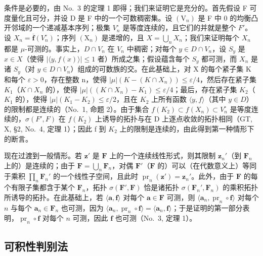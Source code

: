 条件是必要的，由 No.~3 的定理 1 即得；我们来证明它是充分的。首先假设 F 可度量化且可分，并设 D 是 F 中的一个可数稠密集。设 \((\mathrm{V}_{n})\) 是 F 中 0 的均衡凸开邻域的一个递减基本序列；极集 \(V_{n}^{\circ}\) 是等度连续的，且它们的并就是整个 \(F'\)。设 \(X_{n} = \overline{\mathbf{f}}(V_{n}^{\circ})\)；序列 \((\mathrm{X}_{n})\) 是递增的，且 \(X = \bigcup_{n} X_{n}\)；我们来证明每个 \(X_{n}\) 都是 \(\mu\)-可测的。事实上，\(D \cap V_{n}\) 在 \(V_{n}\) 中稠密；对每个 \(y \in D \cap V_{n}\)，设 \(S_{y}\) 是 \(x \in X\)（使得 \(|\langle y, f(x) \rangle| \leqslant 1\) 者）所成之集；假设蕴含每个 \(S_{y}\) 都可测，而 \(X_{n}\) 是诸 \(S_{y}\)（对 \(y \in D \cap V_{n}\)）组成的可数族的交。在此基础上，对 X 的每个紧子集 K 和每个 \(\varepsilon > 0\)，存在整数 n，使得 \(|\mu| (K - (K \cap X_{n})) \leqslant \varepsilon/4\)，然后存在紧子集 \(K_{1}\)（\(K \cap X_{n}\) 的），使得 \(|\mu| ((K \cap X_{n}) - K_{1}) \leqslant \varepsilon/4\)；最后，存在紧子集 \(K_{2}\)（\(K_{1}\) 的），使得 \(|\mu| (K_{1} - K_{2}) \leqslant \varepsilon/2\)，且在 \(K_{2}\) 上所有函数 \(\langle y, f \rangle\)（其中 \(y \in D\)）的限制都是连续的（No.~1, 命题 2）。由于集合 \(f(K_{2}) \subset f(X_{n}) \subset V_{n}^{\circ}\) 是等度连续的，\(\sigma(F', F)\) 在 \(f(K_{2})\) 上诱导的拓扑与在 D 上逐点收敛的拓扑相同（GT, X, §2, No.~4, 定理 1）；因此 f 到 \(K_{2}\) 上的限制是连续的，由此得到第一种情形下的断言。

现在过渡到一般情形。若 \(\mathbf{z}'\) 是 \(\mathbf{F}\) 上的一个连续线性形式，则其限制 \(\mathbf{z}_n'\)（到 \(\mathbf{F}_n\) 上的）是连续的；由于 \(\mathbf{F} = \bigcup_{n} \mathbf{F}_n\)，对偶 \(\mathbf{F}'\)（\(\mathbf{F}\) 的）可以（在代数意义上）等同于乘积 \(\prod_{n} \mathbf{F}_n'\) 的一个线性子空间，且此时 \(\operatorname{pr}_n(\mathbf{z}') = \mathbf{z}_n'\)。此外，由于 \(\mathbf{F}\) 的每个有限子集都含于某个 \(\mathbf{F}_n\)，拓扑 \(\sigma(\mathbf{F}', \mathbf{F})\) 恰是诸拓扑 \(\sigma(\mathbf{F}_n', \mathbf{F}_n)\) 的乘积拓扑所诱导的拓扑。在此基础上，若 \(\langle \mathbf{a}, \mathbf{f} \rangle\) 对每个 \(\mathbf{a} \in \mathbf{F}\) 可测，则 \(\langle \mathbf{a}_n, \operatorname{pr}_n \circ \mathbf{f} \rangle\) 对每个 \(n\) 与每个 \(\mathbf{a}_n \in \mathbf{F}_n\) 也可测，因为 \(\langle \mathbf{a}_n, \operatorname{pr}_n \circ \mathbf{f} \rangle = \langle \mathbf{a}_n, \mathbf{f} \rangle\)；于是证明的第一部分表明，\(\operatorname{pr}_n \circ \mathbf{f}\) 对每个 \(n\) 可测，因此 \(\mathbf{f}\) 也可测（No.~3, 定理 1）。

\subsection{可积性判别法}

